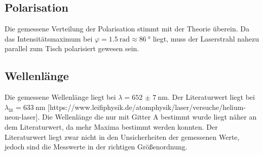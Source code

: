 \subsection{Polarisation}
Die gemessene Verteilung der Polarisation stimmt mit der Theorie überein. Da das Intensitätsmaximum bei $\varphi=\SI{1.5}{\radian}\approx\SI{86}{\degree}$
liegt, muss der Laserstrahl nahezu parallel zum Tisch polarisiert gewesen sein.
\subsection{Wellenlänge}
Die gemessene Wellenlänge liegt bei $\lambda = \SI{652(7)}{\nano\meter}$. Der Literaturwert liegt bei $\lambda_{\text{lit}}=\SI{633}{\nano\meter}$ \cite{}[https://www.leifiphysik.de/atomphysik/laser/versuche/helium-neon-laser].
Die Wellenlänge die nur mit Gitter A bestimmt wurde liegt näher an dem Literaturwert, da mehr Maxima bestimmt werden konnten. 
Der Literaturwert liegt zwar nicht in den Unsicherheiten der gemessenen Werte, jedoch sind die Messwerte in der richtigen 
Größenordnung. 
